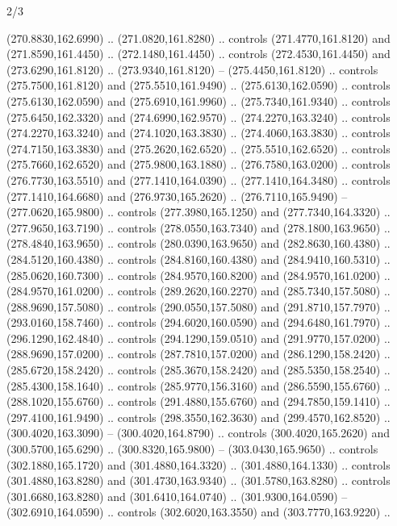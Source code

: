 \begin{flagdescription}{2/3}
\begin{scope}[xshift=0.5\flaglength,yshift=0.5\flagwidth,scale=\flagwidth/259.2]
\begin{scope}[y=0.8pt, x=0.8pt, yscale=-1,shift={(-243,-162)}]
      (270.8830,162.6990) .. (271.0820,161.8280) .. controls (271.4770,161.8120) and
      (271.8590,161.4450) .. (272.1480,161.4450) .. controls (272.4530,161.4450) and
      (273.6290,161.8120) .. (273.9340,161.8120) -- (275.4450,161.8120) .. controls
      (275.7500,161.8120) and (275.5510,161.9490) .. (275.6130,162.0590) .. controls
      (275.6130,162.0590) and (275.6910,161.9960) .. (275.7340,161.9340) .. controls
      (275.6450,162.3320) and (274.6990,162.9570) .. (274.2270,163.3240) .. controls
      (274.2270,163.3240) and (274.1020,163.3830) .. (274.4060,163.3830) .. controls
      (274.7150,163.3830) and (275.2620,162.6520) .. (275.5510,162.6520) .. controls
      (275.7660,162.6520) and (275.9800,163.1880) .. (276.7580,163.0200) .. controls
      (276.7730,163.5510) and (277.1410,164.0390) .. (277.1410,164.3480) .. controls
      (277.1410,164.6680) and (276.9730,165.2620) .. (276.7110,165.9490) --
      (277.0620,165.9800) .. controls (277.3980,165.1250) and (277.7340,164.3320) ..
      (277.9650,163.7190) .. controls (278.0550,163.7340) and (278.1800,163.9650) ..
      (278.4840,163.9650) .. controls (280.0390,163.9650) and (282.8630,160.4380) ..
      (284.5120,160.4380) .. controls (284.8160,160.4380) and (284.9410,160.5310) ..
      (285.0620,160.7300) .. controls (284.9570,160.8200) and (284.9570,161.0200) ..
      (284.9570,161.0200) .. controls (289.2620,160.2270) and (285.7340,157.5080) ..
      (288.9690,157.5080) .. controls (290.0550,157.5080) and (291.8710,157.7970) ..
      (293.0160,158.7460) .. controls (294.6020,160.0590) and (294.6480,161.7970) ..
      (296.1290,162.4840) .. controls (294.1290,159.0510) and (291.9770,157.0200) ..
      (288.9690,157.0200) .. controls (287.7810,157.0200) and (286.1290,158.2420) ..
      (285.6720,158.2420) .. controls (285.3670,158.2420) and (285.5350,158.2540) ..
      (285.4300,158.1640) .. controls (285.9770,156.3160) and (286.5590,155.6760) ..
      (288.1020,155.6760) .. controls (291.4880,155.6760) and (294.7850,159.1410) ..
      (297.4100,161.9490) .. controls (298.3550,162.3630) and (299.4570,162.8520) ..
      (300.4020,163.3090) -- (300.4020,164.8790) .. controls (300.4020,165.2620) and
      (300.5700,165.6290) .. (300.8320,165.9800) -- (303.0430,165.9650) .. controls
      (302.1880,165.1720) and (301.4880,164.3320) .. (301.4880,164.1330) .. controls
      (301.4880,163.8280) and (301.4730,163.9340) .. (301.5780,163.8280) .. controls
      (301.6680,163.8280) and (301.6410,164.0740) .. (301.9300,164.0590) --
      (302.6910,164.0590) .. controls (302.6020,163.3550) and (303.7770,163.9220) ..

\end{scope}
\end{scope}
\end{flagdescription}
